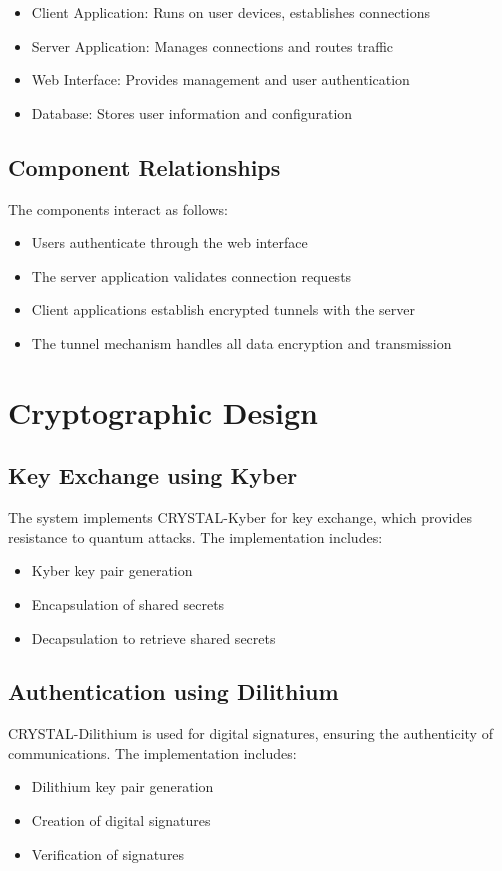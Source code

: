 \documentclass[12pt,a4paper]{report}
\begin{document}
\begin{itemize}
    \item Client Application: Runs on user devices, establishes connections
    \item Server Application: Manages connections and routes traffic
    \item Web Interface: Provides management and user authentication
    \item Database: Stores user information and configuration
\end{itemize}

\subsection{Component Relationships}
The components interact as follows:
\begin{itemize}
    \item Users authenticate through the web interface
    \item The server application validates connection requests
    \item Client applications establish encrypted tunnels with the server
    \item The tunnel mechanism handles all data encryption and transmission
\end{itemize}

\section{Cryptographic Design}
\subsection{Key Exchange using Kyber}
The system implements CRYSTAL-Kyber for key exchange, which provides resistance to quantum attacks. The implementation includes:
\begin{itemize}
    \item Kyber key pair generation
    \item Encapsulation of shared secrets
    \item Decapsulation to retrieve shared secrets
\end{itemize}

\subsection{Authentication using Dilithium}
CRYSTAL-Dilithium is used for digital signatures, ensuring the authenticity of communications. The implementation includes:
\begin{itemize}
    \item Dilithium key pair generation
    \item Creation of digital signatures
    \item Verification of signatures
\end{itemize}
\end{document}
